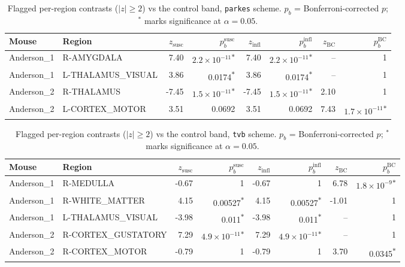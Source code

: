 \begin{table}[H]\centering\small
\caption{Flagged per-region contrasts ($|z|\ge2$) vs the control band, \texttt{parkes} scheme. $p_b$ = Bonferroni-corrected $p$; $^{\ast}$ marks significance at $\alpha=0.05$.}
\begin{tabular}{@{}llrrrrrr@{}}\toprule
Mouse & Region & $z_{\mathrm{susc}}$ & $p_b^{\mathrm{susc}}$ & $z_{\mathrm{infl}}$ & $p_b^{\mathrm{infl}}$ & $z_{\mathrm{BC}}$ & $p_b^{\mathrm{BC}}$ \\\midrule
Anderson\_1 & R-AMYGDALA & 7.40 & $2.2\!\times\!10^{-11}$\textsuperscript{$\ast$} & 7.40 & $2.2\!\times\!10^{-11}$\textsuperscript{$\ast$} & -- & 1 \\
Anderson\_1 & L-THALAMUS\_VISUAL & 3.86 & 0.0174\textsuperscript{$\ast$} & 3.86 & 0.0174\textsuperscript{$\ast$} & -- & 1 \\
Anderson\_2 & R-THALAMUS & -7.45 & $1.5\!\times\!10^{-11}$\textsuperscript{$\ast$} & -7.45 & $1.5\!\times\!10^{-11}$\textsuperscript{$\ast$} & 2.10 & 1 \\
Anderson\_2 & L-CORTEX\_MOTOR & 3.51 & 0.0692 & 3.51 & 0.0692 & 7.43 & $1.7\!\times\!10^{-11}$\textsuperscript{$\ast$} \\
\bottomrule\end{tabular}\end{table}
\begin{table}[H]\centering\small
\caption{Flagged per-region contrasts ($|z|\ge2$) vs the control band, \texttt{tvb} scheme. $p_b$ = Bonferroni-corrected $p$; $^{\ast}$ marks significance at $\alpha=0.05$.}
\begin{tabular}{@{}llrrrrrr@{}}\toprule
Mouse & Region & $z_{\mathrm{susc}}$ & $p_b^{\mathrm{susc}}$ & $z_{\mathrm{infl}}$ & $p_b^{\mathrm{infl}}$ & $z_{\mathrm{BC}}$ & $p_b^{\mathrm{BC}}$ \\\midrule
Anderson\_1 & R-MEDULLA & -0.67 & 1 & -0.67 & 1 & 6.78 & $1.8\!\times\!10^{-9}$\textsuperscript{$\ast$} \\
Anderson\_1 & R-WHITE\_MATTER & 4.15 & 0.00527\textsuperscript{$\ast$} & 4.15 & 0.00527\textsuperscript{$\ast$} & -1.01 & 1 \\
Anderson\_1 & L-THALAMUS\_VISUAL & -3.98 & 0.011\textsuperscript{$\ast$} & -3.98 & 0.011\textsuperscript{$\ast$} & -- & 1 \\
Anderson\_2 & R-CORTEX\_GUSTATORY & 7.29 & $4.9\!\times\!10^{-11}$\textsuperscript{$\ast$} & 7.29 & $4.9\!\times\!10^{-11}$\textsuperscript{$\ast$} & -- & 1 \\
Anderson\_2 & R-CORTEX\_MOTOR & -0.79 & 1 & -0.79 & 1 & 3.70 & 0.0345\textsuperscript{$\ast$} \\
\bottomrule\end{tabular}\end{table}


